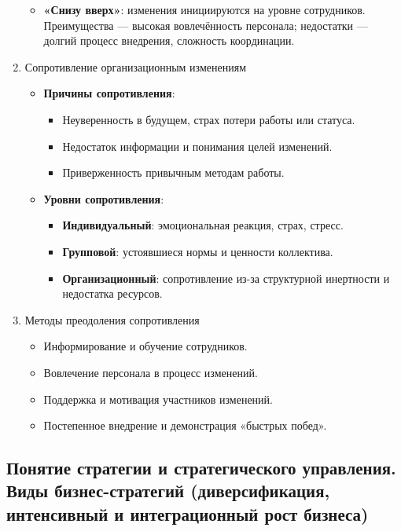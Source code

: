 \begin{enumerate}
\begin{itemize}
            \item \textbf{«Снизу вверх»}: изменения инициируются на уровне сотрудников. Преимущества --- высокая вовлечённость персонала; недостатки --- долгий процесс внедрения, сложность координации.
        \end{itemize}
    \item Сопротивление организационным изменениям
        \begin{itemize}
            \item \textbf{Причины сопротивления}:
            \begin{itemize}
                \item Неуверенность в будущем, страх потери работы или статуса.
                \item Недостаток информации и понимания целей изменений.
                \item Приверженность привычным методам работы.
            \end{itemize}
            \item \textbf{Уровни сопротивления}:
            \begin{itemize}
                \item \textbf{Индивидуальный}: эмоциональная реакция, страх, стресс.
                \item \textbf{Групповой}: устоявшиеся нормы и ценности коллектива.
                \item \textbf{Организационный}: сопротивление из-за структурной инертности и недостатка ресурсов.
            \end{itemize}
        \end{itemize}
    \item Методы преодоления сопротивления
        \begin{itemize}
            \item Информирование и обучение сотрудников.
            \item Вовлечение персонала в процесс изменений.
            \item Поддержка и мотивация участников изменений.
            \item Постепенное внедрение и демонстрация «быстрых побед».
        \end{itemize}
\end{enumerate}

\pagebreak
\subsection{Понятие стратегии и стратегического управления. Виды бизнес-стратегий (диверсификация, интенсивный и интеграционный рост бизнеса)}




